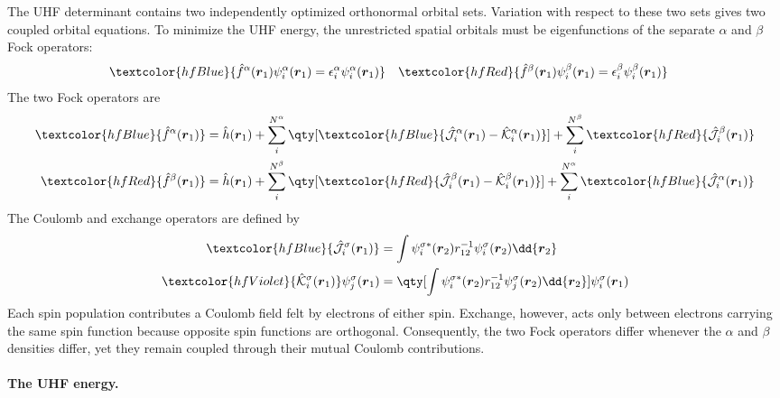 \documentclass[11pt,a4paper,titlepage]{article}
\numberwithin{equation}{section}
\newcommand{\br}{\boldsymbol{r}}
\newcommand{\hh}{\Hat{h}}
\newcommand{\hf}{\Hat{f}}
\newcommand{\chJ}{\Hat{\mathcal{J}}}
\newcommand{\chK}{\Hat{\mathcal{K}}}
\newcommand{\red}[1]{\textcolor{hfRed}{#1}}
\newcommand{\green}[1]{\textcolor{hfGreen}{#1}}
\newcommand{\blue}[1]{\textcolor{hfBlue}{#1}}
\newcommand{\violet}[1]{\textcolor{hfViolet}{#1}}
\begin{document}
The UHF determinant contains two independently optimized orthonormal orbital
sets. Variation with respect to these two sets gives two coupled orbital
equations. To minimize the UHF energy, the unrestricted spatial orbitals must be
eigenfunctions of the separate \red{$\alpha$ and $\beta$ Fock operators}:
\begin{align}
  &
    \blue{\hf^\alpha(\br_1)\psi_i^\alpha(\br_1)
    =\epsilon_i^\alpha\psi_i^\alpha(\br_1)}
  &
  &
    \red{\hf^\beta(\br_1)\psi_i^\beta(\br_1)
    =\epsilon_i^\beta\psi_i^\beta(\br_1)}
\end{align}
The two Fock operators are
\begin{equation}
\begin{split}
  \blue{\hf^\alpha(\br_1)}
  &=\hh(\br_1)
    +\sum_i^{N^\alpha}
      \qty[\blue{\chJ_i^\alpha(\br_1)-\chK_i^\alpha(\br_1)}]
    +\sum_i^{N^\beta}\red{\chJ_i^\beta(\br_1)}
  \\
  \red{\hf^\beta(\br_1)}
  &=\hh(\br_1)
    +\sum_i^{N^\beta}
      \qty[\red{\chJ_i^\beta(\br_1)-\chK_i^\beta(\br_1)}]
    +\sum_i^{N^\alpha}\blue{\chJ_i^\alpha(\br_1)}
\end{split}
\end{equation}
The \green{Coulomb} and \red{exchange} operators are defined by
\begin{equation}
\begin{split}
  \blue{\chJ_i^\sigma(\br_1)}
  &=\int\psi_i^{\sigma *}(\br_2)r_{12}^{-1}
    \psi_i^\sigma(\br_2)\dd{\br_2}
  \\
  \violet{\chK_i^\sigma(\br_1)}\psi_j^\sigma(\br_1)
  &=\qty[\int\psi_i^{\sigma *}(\br_2)r_{12}^{-1}
    \psi_j^\sigma(\br_2)\dd{\br_2}]
    \psi_i^\sigma(\br_1)
\end{split}
\end{equation}
Each spin population contributes a Coulomb field felt by electrons of either
spin. Exchange, however, acts only between electrons carrying the same spin
function because opposite spin functions are orthogonal. Consequently, the
two Fock operators differ whenever the $\alpha$ and $\beta$ densities differ,
yet they remain coupled through their mutual Coulomb contributions.

\paragraph{The UHF energy.}
\end{document}
